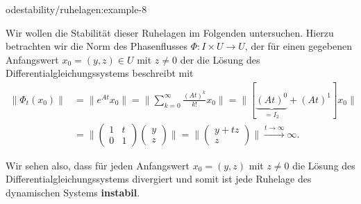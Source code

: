 \documentclass[letterpaper,10pt,english]{jupyterBook}
\begin{document}
\begin{example}{}{odestability/ruhelagen:example-8}
\par
Wir wollen die Stabilität dieser Ruhelagen im Folgenden untersuchen.
Hierzu betrachten wir die Norm des Phasenflusses \(\Phi \colon I \times U \rightarrow U\), der für einen gegebenen Anfangswert \(x_0 = (y,z) \in U\) mit \(z \neq 0\) der die Lösung des Differentialgleichungssystems beschreibt mit
\begin{align*}
\| \Phi_t(x_0) \| &= \| e^{At}x_0 \| = \| \sum_{k=0}^\infty \frac{(At)^k}{k!} x_0\| = \| [\underbrace{(At)^0}_{=I_2} + (At)^1] x_0\| \\
&= \| \begin{pmatrix} 1 & t \\ 0 & 1\end{pmatrix}\begin{pmatrix} y \\ z \end{pmatrix} \| = \| \begin{pmatrix} y + tz \\ z\end{pmatrix} \| \overset{t\to \infty}{\longrightarrow} \infty.
\end{align*}
\par
Wir sehen also, dass für jeden Anfangswert \(x_0 = (y,z)\) mit \(z \neq 0\) die Lösung des Differentialgleichungssystems divergiert und somit ist jede Ruhelage des dynamischen Systems \textbf{instabil}.
\end{example}
\end{document}
